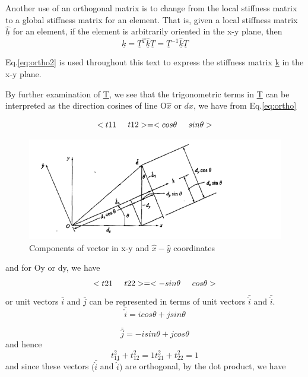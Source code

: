 \documentclass[12pt]{report}
\newcommand{\lab}[1]{
Eq.\ref{#1}
}
\begin{document}
Another use of an orthogonal matrix is to change from the local
stiffness matrix to a global stiffness matrix for an element. That is,
given a local stiffness matrix $\hat{\underline{h}}$ for an element, if the
element is arbitrarily oriented in the x-y plane, then
\begin{equation}\underline{k}=\underline{T}^T \hat{\underline{k}}\underline{T}=\underline{T}^{-1}\hat{\underline{k}}\underline{T}\label{eq:ortho2}\end{equation}

\lab{eq:ortho2} is used throughout this text to express the
stiffness matrix \underline{k} in the x-y plane.

By further examination of \underline{T}, we see that the trigonometric terms in
\underline{T} can be interpreted as the direction cosines of line O$\hat{x}$ or
$d{x}$, we have from \lab{eq:ortho}

\begin{equation}<{t11}\hspace{0.5cm}{t12}>=<{cos\theta}\hspace{0.5cm}{sin\theta}>\end{equation}
\begin{figure}
\includegraphics[scale=0.5]{ortho.PNG}
\caption{Components of vector in x-y and $\hat{x}-\hat{y}$ coordinates} 
\label{fig:orthof}
\end{figure}
and for Oy or dy, we have
\begin{equation}<{t21}\hspace{0.5cm}{t22}>=<{-sin\theta}\hspace{0.5cm}{cos\theta}>\end{equation}
or unit vectors $\bar{i}$ and $\bar{j}$ can be represented in terms of
unit vectors $\bar{\hat{i}}$ and $\bar{\hat{i}}$.
\begin{equation}\bar{\hat{i}} =icos\theta+jsin\theta\end{equation}

\begin{equation}\bar{\hat{j}} =-isin\theta+jcos\theta\end{equation}
and hence
\begin{equation}{t}^2_{11} + {t}^2_{12}=1 
{t}^2_{21} + {t}^2_{22}=1\end{equation}
and since these vectors $(\bar{\hat{i}}$ and $\bar{\hat{i}})$ are
orthogonal, by the dot product, we have
\end{document}
